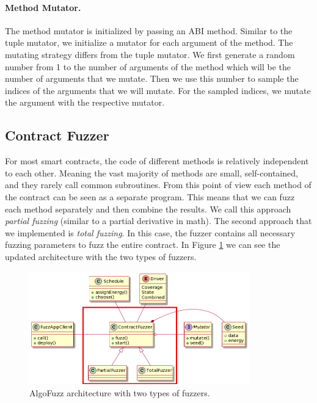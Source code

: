 \paragraph{Method Mutator.}
The method mutator is initialized by passing an \ac{ABI} method.
Similar to the tuple mutator, we initialize a mutator for each argument of the method.
The mutating strategy differs from the tuple mutator.
We first generate a random number from 1 to the number of arguments of the method which will be the number of arguments that we mutate.
Then we use this number to sample the indices of the arguments that we will mutate.
For the sampled indices, we mutate the argument with the respective mutator.


\subsection*{Contract Fuzzer}
For most smart contracts, the code of different methods is relatively independent to each other.
Meaning the vast majority of methods are small, self-contained, and they rarely call common subroutines.
From this point of view each method of the contract can be seen as a separate program.
This means that we can fuzz each method separately and then combine the results.
We call this approach \textit{partial fuzzing} (similar to a partial derivative in math). The second approach that we implemented is \textit{total fuzzing}.
In this case, the fuzzer contains all necessary fuzzing parameters to fuzz the entire contract.
In Figure \ref{fig:architecture-fuzzers} we can see the updated architecture with the two types of fuzzers.

\begin{figure}[htbp]
    \centering
    \includegraphics[width=0.85\textwidth]{figures/arc-fuzzers-r.png}
    \caption{AlgoFuzz architecture with two types of fuzzers.}\label{fig:architecture-fuzzers}
\end{figure}

